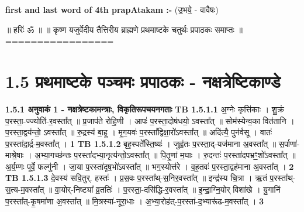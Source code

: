 \documentclass[17pt]{extarticle}
\begin{document}
        \textbf{first and last  word of 4th prapAtakam :-} \newline
        (उ॒भये॒ - वावैषः) \newline 

       

        ॥ हरिः॑ ॐ ॥
॥ कृष्ण यजुर्वेदीय तैत्तिरीय ब्राह्मणे प्रथमाष्टके चतुर्थः प्रपाठकः समाप्तः ॥
================= \newline
        \pagebreak
        
        
        
     \section*{ 1.5     प्रथमाष्टके पञ्चमः प्रपाठकः - नक्षत्रेष्टिकाण्डे }
                \textbf{ 1.5.1     अनुवाकं   1 - नक्षत्रेष्टकामन्त्राः, विकृतिरूपचयनगताः} \newline
                                \textbf{ TB 1.5.1.1} \newline
                  अ॒ग्नेः कृत्ति॑काः । शु॒क्रं प॒रस्ता॒-ज्ज्योति॑-र॒वस्ता᳚त् ॥ प्र॒जाप॑ते रोहि॒णी । आपः॑ प॒रस्ता॒दोष॑धयो॒ ऽवस्ता᳚त् ॥ सोम॑स्येन्व॒का वित॑तानि । प॒रस्ता॒द्वय॑न्तो॒ ऽवस्ता᳚त् ॥ रु॒द्रस्य॑ बा॒हू । मृ॒ग॒यवः॑ प॒रस्ता᳚द्विक्षा॒रो॑ऽवस्ता᳚त् ॥ अदि॑त्यै॒ पुन॑र्वसू । वातः॑ प॒रस्ता॑दा॒र्द्र-म॒वस्ता᳚त् । \textbf{ 1} \newline
                  \newline
                                \textbf{ TB 1.5.1.2} \newline
                  बृह॒स्पते᳚स्ति॒ष्यः॑ । जुह्व॑तः प॒रस्ता॒द्-यज॑माना अ॒वस्ता᳚त् ॥ स॒र्पाणा॑-माश्रे॒षाः । अ॒भ्या॒गच्छ॑न्तः प॒रस्ता॑दभ्या॒नृत्य॑न्तो॒ऽवस्ता᳚त् ॥ पि॒तृ॒णां म॒घाः । रु॒दन्तः॑ प॒रस्ता॑दपभ्रꣳ॒॒शो॑ऽवस्ता᳚त् ॥ अ॒र्य॒म्णः पूर्वे॒ फल्गु॑नी । जा॒या प॒रस्ता॑दृष॒भो॑ऽवस्ता᳚त् ॥ भग॒स्योत्त॑रे । व॒ह॒तवः॑ प॒रस्ता॒द्वह॑माना अ॒वस्ता᳚त् । \textbf{ 2} \newline
                  \newline
                                \textbf{ TB 1.5.1.3} \newline
                  दे॒वस्य॑ सवि॒तुर्. हस्तः॑ । प्र॒स॒वः प॒रस्ता᳚थ्-स॒॒निर॒वस्ता᳚त् ॥ इन्द्र॑स्य चि॒त्रा । ऋ॒तं प॒रस्ता᳚थ्-स॒त्य-म॒वस्ता᳚त् ॥ वा॒योर्-निष्ट्या᳚ व्र॒ततिः॑ । प॒रस्ता॒-दसि॑द्धि-र॒वस्ता᳚त् ॥ इ॒न्द्रा॒ग्नि॒योर् विशा॑खे । यु॒गानि॑ प॒रस्ता᳚त्-कृ॒षमा॑णा अ॒वस्ता᳚त् ॥ मि॒त्रस्या॑-नूरा॒धाः । अ॒भ्या॒रोह॑त्-प॒रस्ता॑-द॒भ्यारू॑ढ-म॒वस्ता᳚त् । \textbf{ 3} \newline
\end{document}

